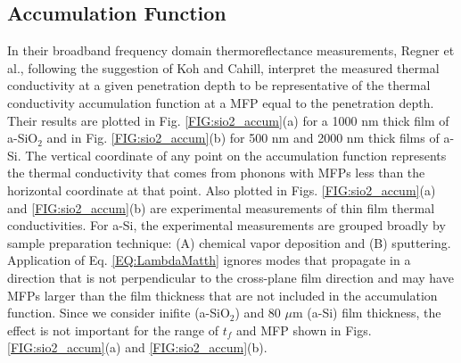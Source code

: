 
\subsection{\label{S:Accumulation}Accumulation Function}

In their broadband frequency domain thermoreflectance 
measurements, Regner et al.,\cite{regner_broadband_2013}  
following the suggestion of Koh and Cahill,\cite{koh_frequency_2007} 
interpret the  
measured thermal conductivity at a given penetration depth 
to be representative of the thermal conductivity accumulation 
function at a MFP equal to the penetration depth.
\cite{dames_thermal_2005,yang_mean_2013} 
Their results are plotted in Fig. \ref{FIG:sio2_accum}(a) 
for a 1000 nm thick film of a-SiO$_2$ 
and in Fig. \ref{FIG:sio2_accum}(b) for 500 nm and 
2000 nm thick films of a-Si. The vertical coordinate 
of any point on the accumulation function represents the thermal 
conductivity that comes from phonons with MFPs less than the 
horizontal coordinate at that point. Also plotted in 
Figs. \ref{FIG:sio2_accum}(a) and \ref{FIG:sio2_accum}(b) 
are experimental measurements of thin film thermal 
conductivities. For a-Si, the experimental measurements are 
grouped broadly by sample preparation technique: 
(A) chemical vapor deposition
\cite{moon_thermal_2002,liu_high_2009,yang_anomalously_2010}
and (B) sputtering.
\cite{kuo_thermal_1992,cahill_thermal_1994,wada_thermal_1996} 
Application of Eq. \eqref{EQ:LambdaMatth} ignores modes 
that propagate in a direction that is not perpendicular to the 
cross-plane film direction and may have MFPs larger than the film 
thickness that are not included in the accumulation function. 
Since we consider inifite (a-SiO$_2$) and 
80 $\mu$m (a-Si) film thickness, the effect is not important 
for the range of $t_f$ and MFP shown in 
Figs. \ref{FIG:sio2_accum}(a) and \ref{FIG:sio2_accum}(b). 

